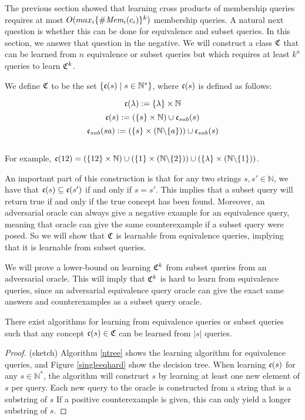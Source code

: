 The previous section showed that learning cross products of membership queries requires at most $O(max_i \{ \#\emph{Mem}_{i}(c_i) \}^k)$ membership queries. 
A natural next question is whether this can be done for equivalence and subset queries. 
In this section, we answer that question in the negative. 
We will construct a class $\mathfrak{C}$ that can be learned from $n$ equivalence or subset queries but which requires at least $k^n$ queries to learn $\mathfrak{C}^k$.  

We define $\mathfrak{C}$ to be the set $\{ \mathfrak{c}(s) \mid s \in \mathbb{N}^* \}$, where $\mathfrak{c}(s)$ is defined as follows:

\[\mathfrak{c}(\lambda) := \{\lambda\} \times \mathbb{N}\]
\[\mathfrak{c}(s) := (\{s\} \times \mathbb{N}) \cup \mathfrak{c}_{sub}(s)\]
\[\mathfrak{c}_{sub}(sa) := (\{s\} \times (\mathbb{N} \backslash \{a\})) \cup \mathfrak{c}_{sub}(s)\]\\

For example, $\mathfrak{c}(12) = (\{12\} \times \mathbb{N}) \cup (\{1\}\times(\mathbb{N} \backslash \{2\}))\cup(\{\lambda\} \times (\mathbb{N} \backslash \{1\}))$.


An important part of this construction is that for any two strings $s,s' \in \mathbb{N}$, we have that $\mathfrak{c}(s) \subseteq \mathfrak{c}(s')$ if and only if $s = s'$. 
This implies that a subset query will return true if and only if the true concept has been found. 
Moreover, an adversarial oracle can always give a negative example for an equivalence query, meaning that oracle can give the same counterexample if a subset query were posed. 
So we will show that $\mathfrak{C}$ is learnable from equivalence queries, implying that it is learnable from subset queries. 

We will prove a lower-bound on learning $\mathfrak{C}^k$ from subset queries from an adversarial oracle. 
This will imply that $\mathfrak{C}^k$ is hard to learn from equivalence queries, since an adversarial equivalence query oracle can give the exact same answers and counterexamples as a subset query oracle.

\begin{proposition}
There exist algorithms for learning from equivalence queries or subset queries such that any concept $\mathfrak{c}(s) \in \mathfrak{C}$ can be learned from $|s|$ queries. 
\end{proposition}
\begin{proof}
(sketch) Algorithm \ref{ntree} shows the learning algorithm for equivalence queries, and Figure \ref{singleeqhard} show the decision tree.  
When learning $\mathfrak{c}(s)$ for any $s \in \mathbb{N}^*$, the algorithm will construct $s$ by learning at least one new element of $s$ per query. 
Each new query to the oracle is constructed from a string that is a substring of $s$
If a positive counterexample is given, this can only yield a longer substring of $s$.
\end{proof}


